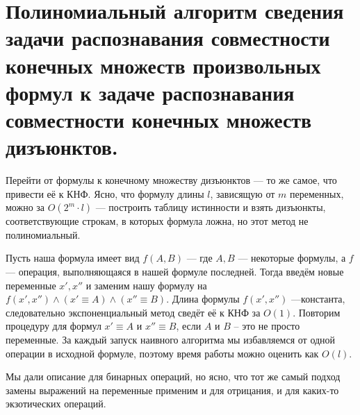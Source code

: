 \documentclass{article}
\begin{document}
\section{Полиномиальный алгоритм сведения задачи распознавания совместности конечных множеств произвольных формул к задаче распознавания совместности конечных множеств дизъюнктов.}
Перейти от формулы к конечному множеству дизъюнктов --- то же самое, что привести её к КНФ. Ясно, что формулу длины $l$, зависящую от $m$ переменных, можно за $O(2^m \cdot l)$ --- построить таблицу истинности и взять дизъюнкты, соответствующие строкам, в которых формула ложна, но этот метод не полиномиальный.

Пусть наша формула имеет вид $f(A, B)$ --- где $A, B$ --- некоторые формулы, а $f$ --- операция, выполняющаяся в нашей формуле последней. Тогда введём новые переменные $x', x''$ и заменим нашу формулу на $f(x', x'') \land (x' \equiv A) \land (x'' \equiv B)$. Длина формулы $f(x', x'')$ ---константа, следовательно экспоненциальный метод сведёт её к КНФ за $O(1)$. Повторим процедуру для формул $x' \equiv A$ и $x'' \equiv B$, если $A$ и $B$ -- это не просто переменные. За каждый запуск наивного алгоритма мы избавляемся от одной операции в исходной формуле, поэтому время работы можно оценить как $O(l)$.

Мы дали описание для бинарных операций, но ясно, что тот же самый подход замены выражений на переменные применим и для отрицания, и для каких-то экзотических операций. 
\end{document}
